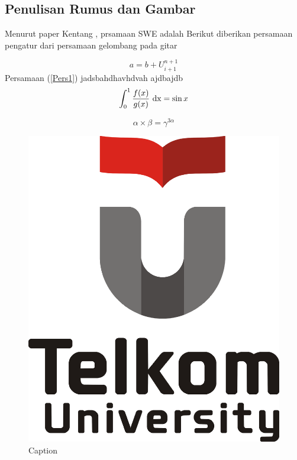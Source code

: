 \subsection{Penulisan Rumus dan Gambar}
Menurut paper Kentang \cite{Kentang}, prsamaan SWE adalah
Berikut diberikan persamaan pengatur dari persamaan gelombang pada gitar

\begin{equation}\label{Pers1}
    a=b+U^{n+1}_{i+1}
\end{equation}
Persamaan (\ref{Pers1}) jadsbahdhavhdvah ajdbajdb
\begin{equation}\label{nama-rumus}
    \int_0^1 \frac{f(x)}{g(x)}\ {\rm dx}=\sin x
\end{equation}

\begin{equation}\label{nama-rumus1}
   \alpha \times \beta =\gamma^{3\alpha}
\end{equation}

\begin{figure}[h!]
    \centering
    \includegraphics[scale=0.1]{Tel-U-Logo.png}
    \caption{Caption}
    \label{fig:my_label1}
\end{figure} 

